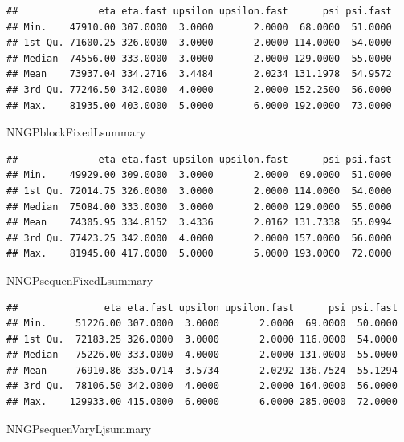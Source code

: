 \documentclass[
]{article}
\newenvironment{Shaded}{\begin{snugshade}}{\end{snugshade}}
\newcommand{\NormalTok}[1]{#1}
\begin{document}
\begin{verbatim}
##              eta eta.fast upsilon upsilon.fast      psi psi.fast
## Min.    47910.00 307.0000  3.0000       2.0000  68.0000  51.0000
## 1st Qu. 71600.25 326.0000  3.0000       2.0000 114.0000  54.0000
## Median  74556.00 333.0000  3.0000       2.0000 129.0000  55.0000
## Mean    73937.04 334.2716  3.4484       2.0234 131.1978  54.9572
## 3rd Qu. 77246.50 342.0000  4.0000       2.0000 152.2500  56.0000
## Max.    81935.00 403.0000  5.0000       6.0000 192.0000  73.0000
\end{verbatim}

\begin{Shaded}
\begin{Highlighting}[]
\NormalTok{NNGPblockFixedLsummary }
\end{Highlighting}
\end{Shaded}

\begin{verbatim}
##              eta eta.fast upsilon upsilon.fast      psi psi.fast
## Min.    49929.00 309.0000  3.0000       2.0000  69.0000  51.0000
## 1st Qu. 72014.75 326.0000  3.0000       2.0000 114.0000  54.0000
## Median  75084.00 333.0000  3.0000       2.0000 129.0000  55.0000
## Mean    74305.95 334.8152  3.4336       2.0162 131.7338  55.0994
## 3rd Qu. 77423.25 342.0000  4.0000       2.0000 157.0000  56.0000
## Max.    81945.00 417.0000  5.0000       5.0000 193.0000  72.0000
\end{verbatim}

\begin{Shaded}
\begin{Highlighting}[]
\NormalTok{NNGPsequenFixedLsummary}
\end{Highlighting}
\end{Shaded}

\begin{verbatim}
##               eta eta.fast upsilon upsilon.fast      psi psi.fast
## Min.     51226.00 307.0000  3.0000       2.0000  69.0000  50.0000
## 1st Qu.  72183.25 326.0000  3.0000       2.0000 116.0000  54.0000
## Median   75226.00 333.0000  4.0000       2.0000 131.0000  55.0000
## Mean     76910.86 335.0714  3.5734       2.0292 136.7524  55.1294
## 3rd Qu.  78106.50 342.0000  4.0000       2.0000 164.0000  56.0000
## Max.    129933.00 415.0000  6.0000       6.0000 285.0000  72.0000
\end{verbatim}

\begin{Shaded}
\begin{Highlighting}[]
\NormalTok{NNGPsequenVaryLjsummary}
\end{Highlighting}
\end{Shaded}
\end{document}
